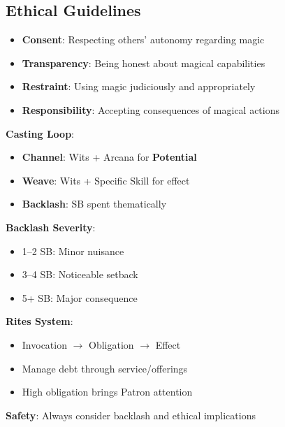 \begin{multicols}{2}
\subsection*{Ethical Guidelines}
\begin{itemize}
\item \textbf{Consent}: Respecting others' autonomy regarding magic
\item \textbf{Transparency}: Being honest about magical capabilities
\item \textbf{Restraint}: Using magic judiciously and appropriately
\item \textbf{Responsibility}: Accepting consequences of magical actions
\end{itemize}

\begin{tcolorbox}[colback=purple!5!white,colframe=purple!75!black,title=Magic Quick Reference,fonttitle=\bfseries]
\textbf{Casting Loop}:
\begin{itemize}
\item \textbf{Channel}: Wits + Arcana for \textbf{Potential}
\item \textbf{Weave}: Wits + Specific Skill for effect
\item \textbf{Backlash}: SB spent thematically
\end{itemize}

\textbf{Backlash Severity}:
\begin{itemize}
\item 1--2 SB: Minor nuisance
\item 3--4 SB: Noticeable setback
\item 5+ SB: Major consequence
\end{itemize}

\textbf{Rites System}:
\begin{itemize}
\item Invocation $\rightarrow$ Obligation $\rightarrow$ Effect
\item Manage debt through service/offerings
\item High obligation brings Patron attention
\end{itemize}

\textbf{Safety}: Always consider backlash and ethical implications
\end{tcolorbox}


\end{multicols}

